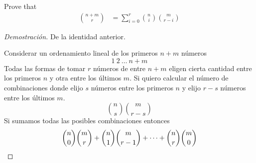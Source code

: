 \item Prove that
\begin{align*}
    \binom{n+m}{r}
    &= \sum_{i=0}^r \binom{n}{i} \binom{m}{r - i}
\end{align*}
\begin{proof}[Demostración] De la identidad anterior.

    Considerar un ordenamiento lineal de los primeros $n+m$ números
    \[ 1\ 2\ \dots\ n+m\]
    Todas las formas de tomar $r$ números de entre $n+m$ eligen cierta cantidad entre los primeros $n$ y otra entre los últimos $m$. Si quiero calcular el número de combinaciones donde elijo $s$ números entre los primeros $n$ y elijo $r-s$ números entre los últimos $m$.
    \[ \binom{n}{s} \binom{m}{r-s} \]
    Si sumamos todas las posibles combinaciones entonces
    \[ \binom{n}{0} \binom{m}{r} + \binom{n}{1} \binom{m}{r - 1} + \cdots + \binom{n}{r} \binom{m}{0} \qedhere \]
\end{proof}